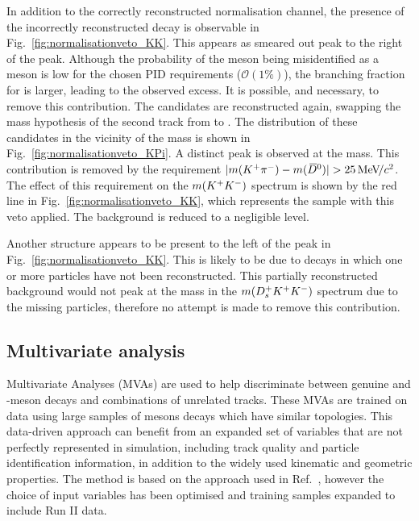 In addition to the correctly reconstructed normalisation channel, the presence of the incorrectly reconstructed \decay{\Bp}{\Dsp(\decay{\Dzb}{\Kp\pim})} decay is observable in Fig.~\ref{fig:normalisationveto_KK}. This appears as smeared out peak to the right of the \Dzb peak. Although the probability of the \pim meson being misidentified as a \Km meson is low for the chosen PID requirements ($\mathcal{O}(1\%)$), the branching fraction for \decay{\Dzb}{\Kp\pim} is larger, leading to the observed excess. It is possible, and necessary, to remove this contribution. The \Kp\Km candidates are reconstructed again, swapping the mass hypothesis of the second track from \Km to \pim. The distribution of these candidates in the vicinity of the \Dzb mass is shown in Fig.~\ref{fig:normalisationveto_KPi}. A distinct peak is observed at the \Dzb mass. This contribution is removed by the requirement $|m({{K}^+}{{\pi}^-}) - m({{\kern 0.2em\overline{\kern -0.2em D}{}}{}^0})| > 25 {\mathrm{\,Me\kern -0.1em V\!/}c^2}$. The effect of this requirement on the $m({{K}^+}{{K}^-})$ spectrum is shown by the red line in Fig.~\ref{fig:normalisationveto_KK}, which represents the sample with this veto applied. The \decay{\Bp}{\Dsp(\decay{\Dzb}{\Kp\pim})} background is reduced to a negligible level.

Another structure appears to be present to the left of the \Dzb peak in Fig.~\ref{fig:normalisationveto_KK}. This is likely to be due to  decays in which one or more particles have not been reconstructed. This partially reconstructed background would not peak at the \Bp mass in the $m({{D}^+_{s}}{{K}^+}{{K}^-})$ spectrum due to the missing particles, therefore no attempt is made to remove this contribution.


\subsection{Multivariate analysis}
\label{sec:selection_MVA}

Multivariate Analyses (MVAs) are used to help discriminate between genuine \Dsp and \phiz-meson decays and combinations of unrelated tracks. 
These MVAs are trained on data using large samples of \B mesons decays which have similar topologies. 
This data-driven approach can benefit from an expanded set of variables that are not perfectly represented in simulation, including track quality and particle identification information, in addition to the widely used kinematic and geometric properties.
The method is based on the approach used in Ref.~\cite{LHCb-PAPER-2012-050}, however the choice of input variables has been optimised and training samples expanded to include Run II data.

